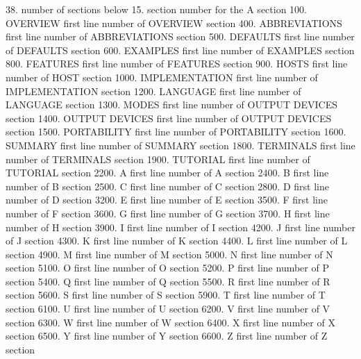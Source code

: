 38.                          number of     sections below
15.                          section number for the   A     section
  100.    OVERVIEW           first line number of OVERVIEW section
  400.    ABBREVIATIONS      first line number of ABBREVIATIONS section
  500.    DEFAULTS           first line number of DEFAULTS section
  600.    EXAMPLES           first line number of EXAMPLES section
  800.    FEATURES           first line number of FEATURES section
  900.    HOSTS              first line number of HOST section
 1000.    IMPLEMENTATION     first line number of IMPLEMENTATION section
 1200.    LANGUAGE           first line number of LANGUAGE section
 1300.    MODES              first line number of OUTPUT DEVICES section
 1400.    OUTPUT DEVICES     first line number of OUTPUT DEVICES section
 1500.    PORTABILITY        first line number of PORTABILITY section
 1600.    SUMMARY            first line number of SUMMARY section
 1800.    TERMINALS          first line number of TERMINALS section
 1900.    TUTORIAL           first line number of TUTORIAL section
 2200.    A                  first line number of A section
 2400.    B                  first line number of B section
 2500.    C                  first line number of C section
 2800.    D                  first line number of D section
 3200.    E                  first line number of E section
 3500.    F                  first line number of F section
 3600.    G                  first line number of G section
 3700.    H                  first line number of H section
 3900.    I                  first line number of I section
 4200.    J                  first line number of J section
 4300.    K                  first line number of K section
 4400.    L                  first line number of L section
 4900.    M                  first line number of M section
 5000.    N                  first line number of N section
 5100.    O                  first line number of O section
 5200.    P                  first line number of P section
 5400.    Q                  first line number of Q section
 5500.    R                  first line number of R section
 5600.    S                  first line number of S section
 5900.    T                  first line number of T section
 6100.    U                  first line number of U section
 6200.    V                  first line number of V section
 6300.    W                  first line number of W section
 6400.    X                  first line number of X section
 6500.    Y                  first line number of Y section
 6600.    Z                  first line number of Z section
 
